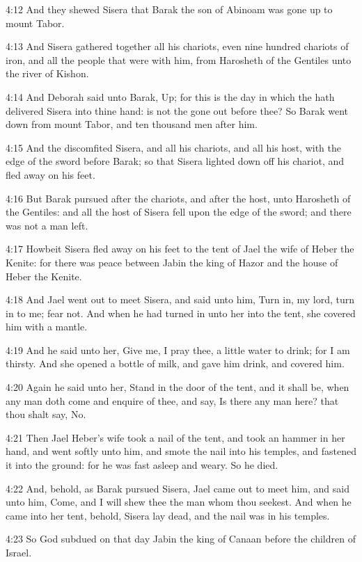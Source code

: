 4:12 And they shewed Sisera that Barak the son of Abinoam was gone up
to mount Tabor.

4:13 And Sisera gathered together all his chariots, even nine hundred
chariots of iron, and all the people that were with him, from
Harosheth of the Gentiles unto the river of Kishon.

4:14 And Deborah said unto Barak, Up; for this is the day in which the
\LORD hath delivered Sisera into thine hand: is not the \LORD gone out
before thee? So Barak went down from mount Tabor, and ten thousand men
after him.

4:15 And the \LORD discomfited Sisera, and all his chariots, and all
his host, with the edge of the sword before Barak; so that Sisera
lighted down off his chariot, and fled away on his feet.

4:16 But Barak pursued after the chariots, and after the host, unto
Harosheth of the Gentiles: and all the host of Sisera fell upon the
edge of the sword; and there was not a man left.

4:17 Howbeit Sisera fled away on his feet to the tent of Jael the wife
of Heber the Kenite: for there was peace between Jabin the king of
Hazor and the house of Heber the Kenite.

4:18 And Jael went out to meet Sisera, and said unto him, Turn in, my
lord, turn in to me; fear not. And when he had turned in unto her into
the tent, she covered him with a mantle.

4:19 And he said unto her, Give me, I pray thee, a little water to
drink; for I am thirsty. And she opened a bottle of milk, and gave him
drink, and covered him.

4:20 Again he said unto her, Stand in the door of the tent, and it
shall be, when any man doth come and enquire of thee, and say, Is
there any man here? that thou shalt say, No.

4:21 Then Jael Heber's wife took a nail of the tent, and took an
hammer in her hand, and went softly unto him, and smote the nail into
his temples, and fastened it into the ground: for he was fast asleep
and weary. So he died.

4:22 And, behold, as Barak pursued Sisera, Jael came out to meet him,
and said unto him, Come, and I will shew thee the man whom thou
seekest. And when he came into her tent, behold, Sisera lay dead, and
the nail was in his temples.

4:23 So God subdued on that day Jabin the king of Canaan before the
children of Israel.

